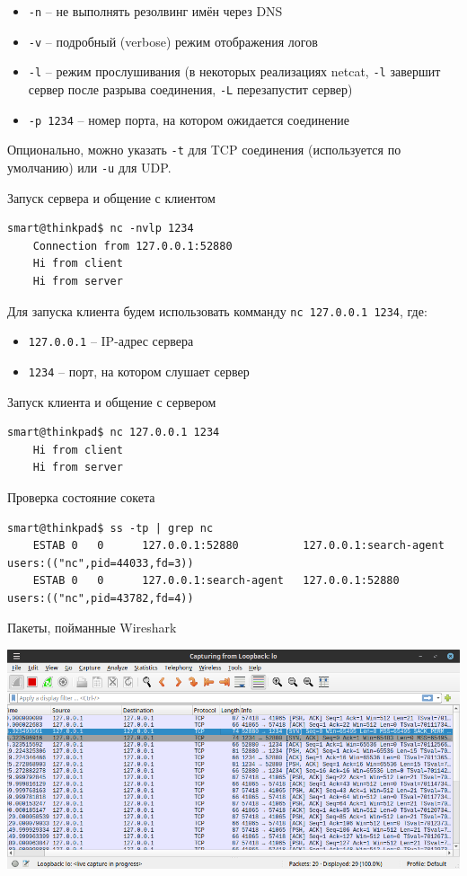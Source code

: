 \begin{itemize}
    \item \texttt{-n} -- не выполнять резолвинг имён через DNS
    \item \texttt{-v} -- подробный (verbose) режим отображения логов
    \item \texttt{-l} -- режим прослушивания (в некоторых реализациях netcat, \texttt{-l} завершит сервер после разрыва соединения, \texttt{-L} перезапустит сервер)
    \item \texttt{-p 1234} -- номер порта, на котором ожидается соединение
\end{itemize}

Опционально, можно указать \texttt{-t} для TCP соединения (используется по умолчанию) или \texttt{-u} для UDP.

Запуск сервера и общение с клиентом
\begin{Verbatim}[frame=single,breaklines=true,breakanywhere=true]
    smart@thinkpad$ nc -nvlp 1234
    Connection from 127.0.0.1:52880
    Hi from client
    Hi from server
\end{Verbatim}

Для запуска клиента будем использовать комманду \texttt{nc 127.0.0.1 1234}, где:
\begin{itemize}
    \item \texttt{127.0.0.1} -- IP-адрес сервера
    \item \texttt{1234} -- порт, на котором слушает сервер
\end{itemize}

Запуск клиента и общение с сервером
\begin{Verbatim}[frame=single,breaklines=true,breakanywhere=true]
    smart@thinkpad$ nc 127.0.0.1 1234
    Hi from client
    Hi from server
\end{Verbatim}

Проверка состояние сокета
\begin{Verbatim}[frame=single,breaklines=true,breakanywhere=true]
    smart@thinkpad$ ss -tp | grep nc
    ESTAB 0   0      127.0.0.1:52880          127.0.0.1:search-agent users:(("nc",pid=44033,fd=3))              
    ESTAB 0   0      127.0.0.1:search-agent   127.0.0.1:52880        users:(("nc",pid=43782,fd=4)) 
\end{Verbatim}

Пакеты, пойманные Wireshark
\begin{center}
    \includegraphics[scale=0.55]{res/7.wireshark-nc-chat.png}
\end{center}

